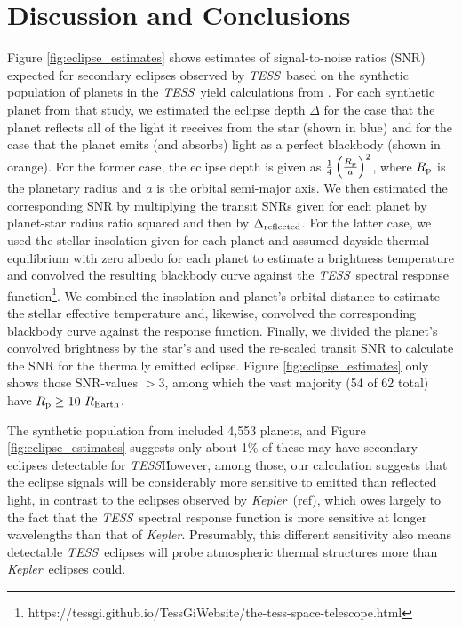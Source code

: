 \documentclass[manuscript]{aastex}
\newcommand{\kepler}{{\it Kepler}}
\newcommand{\tess}{{\it TESS}}
\begin{document}


\section{Discussion and Conclusions}
Figure \ref{fig:eclipse_estimates} shows estimates of signal-to-noise ratios (SNR) expected for secondary eclipses observed by \tess\ based on the synthetic population of planets in the \tess\ yield calculations from \citet{2018arXiv180405050B}. For each synthetic planet from that study, we estimated the eclipse depth $\Delta$ for the case that the planet reflects all of the light it receives from the star (shown in blue) and for the case that the planet emits (and absorbs) light as a perfect blackbody (shown in orange). For the former case, the eclipse depth is given as $\frac{1}{4} \left( \frac{R_{\rm p}}{a} \right)^2$, where $R_{\rm p}$ is the planetary radius and $a$ is the orbital semi-major axis. We then estimated the corresponding SNR by multiplying the transit SNRs given for each planet by planet-star radius ratio squared and then by $\Delta_{\rm reflected}$. For the latter case, we used the stellar insolation given for each planet and assumed dayside thermal equilibrium with zero albedo for each planet to estimate a brightness temperature and convolved the resulting blackbody curve against the \tess\ spectral response function\footnote{https://tessgi.github.io/TessGiWebsite/the-tess-space-telescope.html}. We combined the insolation and planet's orbital distance to estimate the stellar effective temperature and, likewise, convolved the corresponding blackbody curve against the response function. Finally, we divided the planet's convolved brightness by the star's and used the re-scaled transit SNR to calculate the SNR for the thermally emitted eclipse. Figure \ref{fig:eclipse_estimates} only shows those SNR-values $> 3$, among which the vast majority (54 of 62 total) have $R_{\rm p} \geq 10\ R_{\rm Earth}$.

The synthetic population from \citet{2018arXiv180405050B} included 4,553 planets, and Figure \ref{fig:eclipse_estimates} suggests only about 1\% of these may have secondary eclipses detectable for \tess\. However, among those, our calculation suggests that the eclipse signals will be considerably more sensitive to emitted than reflected light, in contrast to the eclipses observed by \kepler\ (ref), which owes largely to the fact that the \tess\ spectral response function is more sensitive at longer wavelengths than that of \kepler. Presumably, this different sensitivity also means detectable \tess\ eclipses will probe atmospheric thermal structures more than \kepler\ eclipses could.
\end{document}
